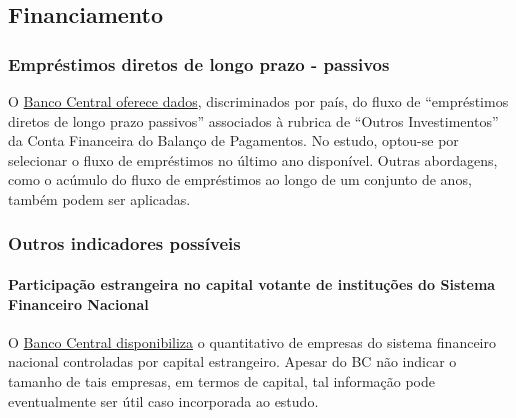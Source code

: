 \documentclass[
]{article}
\begin{document}
\hypertarget{financiamento}{%
\subsection{Financiamento}\label{financiamento}}

\hypertarget{empruxe9stimos-diretos-de-longo-prazo---passivos}{%
\subsubsection{Empréstimos diretos de longo prazo -
passivos}\label{empruxe9stimos-diretos-de-longo-prazo---passivos}}

O
\href{https://www.bcb.gov.br/content/estatisticas/Documents/Tabelas_especiais/EmprestimosDiretosLongoPrazoPassivop.xls}{Banco
Central oferece dados}, discriminados por país, do fluxo de
``empréstimos diretos de longo prazo passivos'' associados à rubrica de
``Outros Investimentos'' da Conta Financeira do Balanço de Pagamentos.
No estudo, optou-se por selecionar o fluxo de empréstimos no último ano
disponível. Outras abordagens, como o acúmulo do fluxo de empréstimos ao
longo de um conjunto de anos, também podem ser aplicadas.

\hypertarget{outros-indicadores-possuxedveis-2}{%
\subsubsection{Outros indicadores
possíveis}\label{outros-indicadores-possuxedveis-2}}

\hypertarget{participauxe7uxe3o-estrangeira-no-capital-votante-de-instituuxe7uxf5es-do-sistema-financeiro-nacional}{%
\paragraph{Participação estrangeira no capital votante de instituções do
Sistema Financeiro
Nacional}\label{participauxe7uxe3o-estrangeira-no-capital-votante-de-instituuxe7uxf5es-do-sistema-financeiro-nacional}}

O
\href{https://www.bcb.gov.br/content/publicacoes/evolucaosfn/r202012/T4CE_Quadro\%2012\%20-\%20Participa\%C3\%A7\%C3\%A3o\%20estrangeira\%20no\%20capital\%20votante\%20de\%20institui\%C3\%A7\%C3\%B5es\%20do\%20SFN.pdf}{Banco
Central disponibiliza} o quantitativo de empresas do sistema financeiro
nacional controladas por capital estrangeiro. Apesar do BC não indicar o
tamanho de tais empresas, em termos de capital, tal informação pode
eventualmente ser útil caso incorporada ao estudo.
\end{document}
